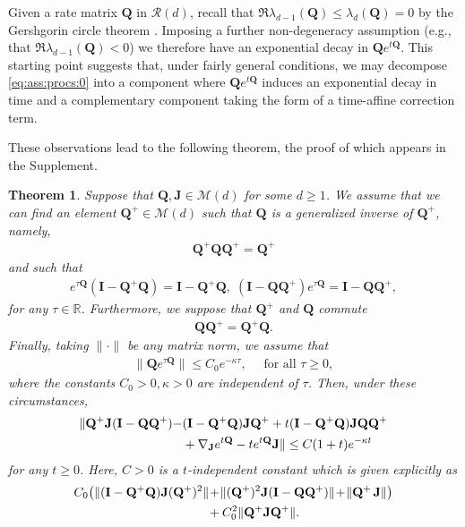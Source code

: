 \documentclass[9pt,twocolumn,twoside]{pnas-new}
\newcommand{\bbR}{{\mathbb R}}
\newcommand{\?}{\textbf{?}}
\newcommand{\QQ}{\mathbf{Q}}
\newcommand{\JJ}{\mathbf{J}}
\newcommand{\II}{\mathbf{I}}
\newtheorem{theorem}{\bf Theorem}
\begin{document}
Given a rate matrix $\QQ$ in $\mathcal{R}(d)$, recall that
$\Re \lambda_{d-1}(\QQ) \leq \lambda_{d}(\QQ)= 0$ by
the Gershgorin circle theorem \cite[Theorem
6.1.1]{horn:johnson:2012}.  Imposing a further
non-degeneracy assumption (e.g., that $\Re \lambda_{d-1}(\QQ)< 0$) we
therefore have an exponential decay in $\QQ e^{t\QQ}$.  This starting
point suggests that, under fairly general conditions, we may decompose
\eqref{eq:ass:procs:0} into a component where $\QQ e^{t\QQ}$ induces
an exponential decay in time and a complementary component taking the
form of a time-affine correction term.

These observations lead to the following theorem, the proof of which appears
in the Supplement.
\begin{theorem}\label{thm:ass:error}
  Suppose that $\QQ, \JJ \in \mathcal{M}(d)$ for some $d \geq 1$.  We
  assume that we can find an element $\QQ^+ \in \mathcal{M}(d)$ such that
  $\QQ$ is a generalized inverse of $\QQ^+$, namely,
  \begin{align}\label{eq:GI:prop}
    \QQ^+ \QQ \QQ^+ = \QQ^+
  \end{align}
  and such that
  \begin{align}\label{eq:MP:proj:prop}
    e^{\tau \QQ}(\II - \QQ^+ \QQ) \!=\!  \II - \QQ^+ \QQ, \;
    (\II - \QQ \QQ^+)e^{\tau \QQ} \!=\!  \II - \QQ \QQ^+,
  \end{align}
  for any $\tau \in \bbR$. Furthermore, we suppose that $\QQ^+$ and
  $\QQ$ commute
  \begin{align}\label{eq:GI:com}
    \QQ \QQ^+ = \QQ^+ \QQ.
  \end{align}
  Finally, taking $\|\cdot\|$ be any matrix norm, we assume that
  \begin{align}\label{eq:qetq:exp:decay}
    \| \QQ e^{\tau \QQ}\| \leq C_0 e^{-\kappa \tau},
    \quad
    \text{ for all } \tau \geq 0,
  \end{align}
  where the constants $C_0 > 0, \kappa > 0$
  are independent of $\tau$.  Then, under these circumstances, 
  \begin{align}\label{eq:ass:error}
    \|\QQ^+ \JJ (\II - \QQ \QQ^{+})-& (\II -\QQ^+ \QQ) \JJ \QQ^{+}
        +t(\II -\QQ^+ \QQ) \JJ \QQ \QQ^{+}
                \notag\\
      &
        +  \nabla_\JJ e^{t \QQ} - t  e^{t\QQ} \JJ\| \leq C(1+ t)e^{-\kappa t}
\end{align}
for any $t \geq 0$.  Here, $C > 0$ is a $t$-independent
constant which is given explicitly as
\begin{align}
  C_0 \big(\| (\II -\QQ^+ \QQ) \JJ (\QQ^{+})^2\|
  \!&+\! \|(\QQ^+)^2\JJ (\II - \QQ \QQ^{+})\|
    \!+\! \|\QQ^+ \hspace{0.5mm}\JJ\|\big)
    \notag\\
    &+ C_0^2 \| \QQ^+  \JJ  \QQ^{+} \|.
      \label{eq:exp:error:ass:er}
  \end{align}
\end{theorem}
\end{document}
